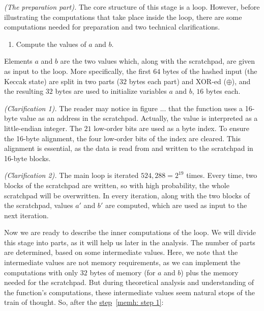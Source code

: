 \noindent \emph{(The preparation part).} The core structure of this stage is a loop. However, before illustrating the computations that take place inside the loop, there are some computations needed for preparation and two technical clarifications.

\begin{enumerate}
  \item \label{memh: step 1} Compute the values of $a$ and $b$.
\end{enumerate}
Elements $a$ and $b$ are the two values which, along with the scratchpad, are given as input to the loop. More specifically, the first $64$ bytes of the hashed input (the Keccak state) are split in two parts ($32$ bytes each part) and XOR-ed ($\oplus$), and the resulting $32$ bytes are used to initialize variables $a$ and $b$, $16$ bytes each.

\noindent \emph{(Clarification 1).} The reader may notice in figure ... that the function uses a 16-byte value as an address in the scratchpad. Actually, the value is interpreted as a little-endian integer. The $21$ low-order bits are used as a byte index. To ensure the 16-byte alignment, the four low-order bits of the index are cleared. This alignment is essential, as the data is read from and written to the scratchpad in 16-byte blocks.

\noindent \emph{(Clarification 2).} The main loop is iterated $524,288 = 2^{19}$ times. Every time, two blocks of the scratchpad are written, so with high probability, the whole scratchpad will be overwritten. In every iteration, along with the two blocks of the scratchpad, values $a'$ and $b'$ are computed, which are used as input to the next iteration.

Now we are ready to describe the inner computations of the loop. We will divide this stage into parts, as it will help us later in the analysis. The number of parts are determined, based on some intermediate values. Here, we note that the intermediate values are not memory requirements, as we can implement the computations with only $32$ bytes of memory (for $a$ and $b$) plus the memory needed for the scratchpad. But during theoretical analysis and understanding of the function's computations, these intermediate values seem natural stops of the train of thought. So, after the \hyperref[memh: step 1]{step}~\ref{memh: step 1}:

